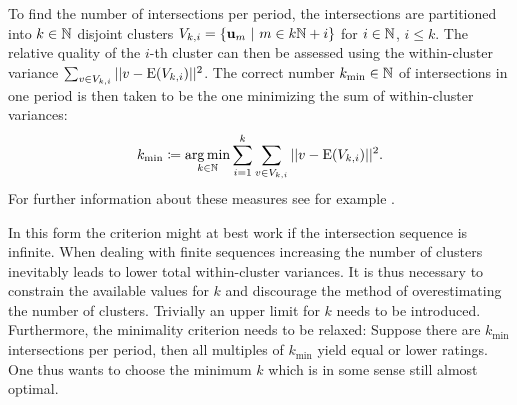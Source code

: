 To find the number of intersections per period, the intersections are partitioned into $k \in \mathbb{N}$ disjoint clusters $V_{k,i} = \{ \textbf{u}_m\ |\ m \in k\mathbb{N}+i \}$ for $i \in \mathbb{N}$, $i \le k$.
The relative quality of the $i$-th cluster can then be assessed using the within-cluster variance $\sum_{v \in V_{k,i} } ||v - \operatorname{E}(V_{k,i})||^2$.
The correct number $k_{\text{min}} \in \mathbb{N}$ of intersections in one period is then taken to be the one minimizing the sum of within-cluster variances:
\[
	k_\text{min} \coloneqq \operatorname*{arg\,min}_{k \in \mathbb{N}} \sum_{i = 1}^k \sum_{v \in V_{k,i} } ||v - \operatorname{E}(V_{k,i})||^2 \text.
\]
For further information about these measures see for example \cite{halkidi2001clustering}. %

In this form the criterion might at best work if the intersection sequence is infinite.
When dealing with finite sequences increasing the number of clusters inevitably leads to lower total within-cluster variances.
It is thus necessary to constrain the available values for $k$ and discourage the method of overestimating the number of clusters.
Trivially an upper limit for $k$ needs to be introduced.
Furthermore, the minimality criterion needs to be relaxed: Suppose there are $k_\text{min}$ intersections per period, then all multiples of $k_\text{min}$ yield equal or lower ratings.
One thus wants to choose the minimum $k$ which is in some sense still almost optimal.